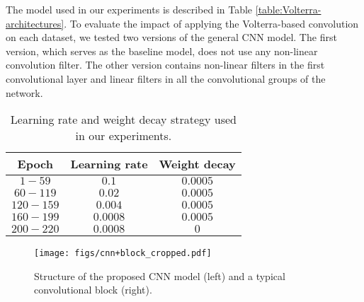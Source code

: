 \documentclass[10pt,twocolumn,letterpaper]{article}
\begin{document}
   The model used in our experiments is described in Table \ref{table:Volterra-architectures}.
   To evaluate the impact of applying the Volterra-based convolution on each dataset, we tested two versions of the general CNN model. The first version, which serves as the baseline model, does not use any non-linear convolution filter. The other version contains non-linear filters in the first convolutional layer and linear filters in all the convolutional groups of the network. 

\begin{table}[b]
\centering
\setlength{\tabcolsep}{.3em}
\begin{tabular}{|c|c|c|}
\hline
\textbf{Epoch} & \textbf{Learning rate} & \textbf{Weight decay} \\
\hline
$1-59$    & $0.1$    & $0.0005$ \\ \hline
$60-119$  & $0.02$   & $0.0005$ \\ \hline
$120-159$ & $0.004$  & $0.0005$ \\ \hline
$160-199$ & $0.0008$ & $0.0005$ \\ \hline
$200-220$ & $0.0008$ & $0$    \\
\hline
\end{tabular}
\caption{Learning rate and weight decay strategy used in our experiments.}
\label{tab:Lr-strategy}
\end{table}

\begin{figure}[!hb]
  \centering
  \texttt{[image: figs/cnn+block\_cropped.pdf]}
  \caption{Structure of the proposed CNN model (left) and a typical convolutional block (right).}
\end{figure}
\end{document}
